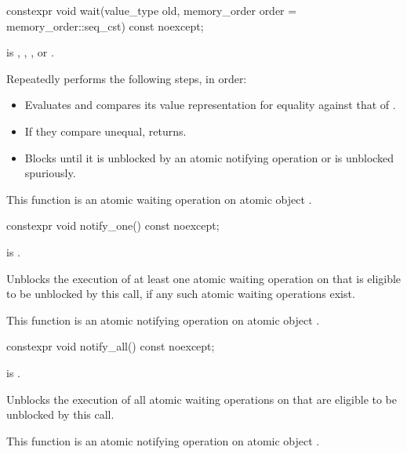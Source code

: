 %
\begin{itemdecl}
constexpr void wait(value_type old, memory_order order = memory_order::seq_cst) const noexcept;
\end{itemdecl}

\begin{itemdescr}
\pnum
\expects
{} is
,
,
, or
.

\pnum
\effects
Repeatedly performs the following steps, in order:
\begin{itemize}
\item
  Evaluates  and
  compares its value representation for equality against that of .
\item
  If they compare unequal, returns.
\item
  Blocks until it
  is unblocked by an atomic notifying operation or is unblocked spuriously.
\end{itemize}

\pnum
\remarks
This function is an atomic waiting operation
on atomic object .
\end{itemdescr}

%
\begin{itemdecl}
constexpr void notify_one() const noexcept;
\end{itemdecl}

\begin{itemdescr}
\pnum
\constraints
{} is .

\pnum
\effects
Unblocks the execution of at least one atomic waiting operation on 
that is eligible to be unblocked by this call,
if any such atomic waiting operations exist.

\pnum
\remarks
This function is an atomic notifying operation
on atomic object .
\end{itemdescr}

%
\begin{itemdecl}
constexpr void notify_all() const noexcept;
\end{itemdecl}

\begin{itemdescr}
\pnum
\constraints
{} is .

\pnum
\effects
Unblocks the execution of all atomic waiting operations on 
that are eligible to be unblocked by this call.

\pnum
\remarks
This function is an atomic notifying operation
on atomic object .
\end{itemdescr}

